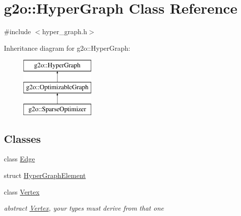 \hypertarget{classg2o_1_1_hyper_graph}{}\section{g2o\+:\+:Hyper\+Graph Class Reference}
\label{classg2o_1_1_hyper_graph}


{\ttfamily \#include $<$hyper\+\_\+graph.\+h$>$}

Inheritance diagram for g2o\+:\+:Hyper\+Graph\+:\begin{figure}[H]
\begin{center}
\leavevmode
\includegraphics[height=3.000000cm]{classg2o_1_1_hyper_graph}
\end{center}
\end{figure}
\subsection*{Classes}
\begin{DoxyCompactItemize}
\item 
class \mbox{\hyperlink{classg2o_1_1_hyper_graph_1_1_edge}{Edge}}
\item 
struct \mbox{\hyperlink{structg2o_1_1_hyper_graph_1_1_hyper_graph_element}{Hyper\+Graph\+Element}}
\item 
class \mbox{\hyperlink{classg2o_1_1_hyper_graph_1_1_vertex}{Vertex}}
\begin{DoxyCompactList}\small\item\em abstract \mbox{\hyperlink{classg2o_1_1_hyper_graph_1_1_vertex}{Vertex}}, your types must derive from that one \end{DoxyCompactList}\end{DoxyCompactItemize}

